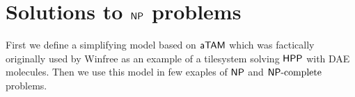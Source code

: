 \chapter{Solutions to $\mathsf{NP}$ problems}   %
\label{chap:problems}




First we define a simplifying model based on $\mathsf{aTAM}$ which was factically originally used by Winfree \cite{winfree_phd} as an example of a tilesystem solving $\sf HPP$ with DAE molecules. Then we use this model in few exaples of $\mathsf{NP}$ and $\mathsf{NP}\textnormal{-complete}$ problems.








